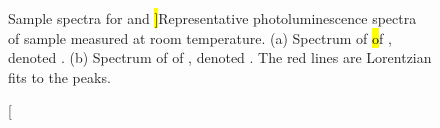 	\begin{figure}[!htb]
		\begin{subfigure}{0.5\linewidth}
			\centering
			\caption{}\label{subfig::emnarrow}
		\end{subfigure}
		\hfill
		\begin{subfigure}{0.5\linewidth}
			\centering
			\caption{}\label{subfig::embroad}
		\end{subfigure}
		\caption[Sample \siv \pl spectra for \vl and \hl]{Representative photoluminescence spectra of sample \insituHao measured at room temperature. (a) Spectrum of \hl of , denoted \emnarrow. (b) Spectrum of \vl of , denoted \embroad. The red lines are Lorentzian fits to the peaks.}
		\label{fig::spectra}
	\end{figure}

